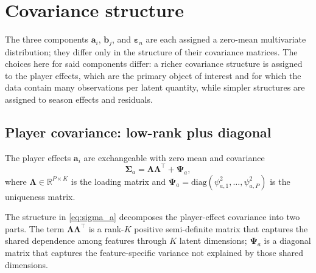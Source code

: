 \section{Covariance structure}
\label{sec:covariance}

The three components $\mathbf{a}_i$, $\mathbf{b}_j$, and $\boldsymbol{\varepsilon}_n$ are each assigned a zero-mean multivariate distribution; they differ only in the structure of their covariance matrices. The choices here for said components differ: a richer covariance structure is assigned to the player effects, which are the primary object of interest and for which the data contain many observations per latent quantity, while simpler structures are assigned to season effects and residuals.

\subsection{Player covariance: low-rank plus diagonal}

\begin{definition}
\label{def:sigma_a}
The player effects $\mathbf{a}_i$ are exchangeable with zero mean and covariance
\begin{equation}
\boldsymbol{\Sigma}_a = \boldsymbol{\Lambda}\boldsymbol{\Lambda}^\top + \boldsymbol{\Psi}_a,
\label{eq:sigma_a}
\end{equation}
where $\boldsymbol{\Lambda} \in \mathbb{R}^{P \times K}$ is the loading matrix and $\boldsymbol{\Psi}_a = \mathrm{diag}(\psi_{a,1}^2, \ldots, \psi_{a,P}^2)$ is the uniqueness matrix.
\end{definition}

The structure in \eqref{eq:sigma_a} decomposes the player-effect covariance into two parts. The term $\boldsymbol{\Lambda}\boldsymbol{\Lambda}^\top$ is a rank-$K$ positive semi-definite matrix that captures the shared dependence among features through $K$ latent dimensions; $\boldsymbol{\Psi}_a$ is a diagonal matrix that captures the feature-specific variance not explained by those shared dimensions.

